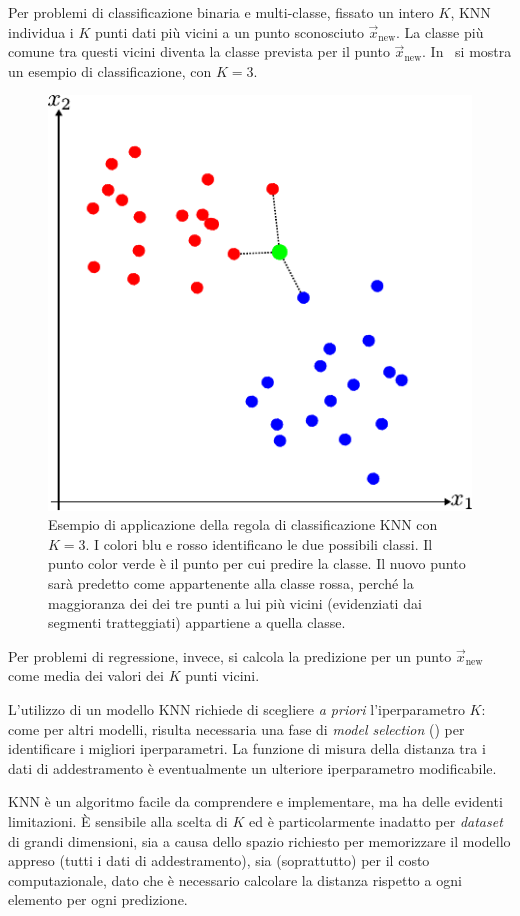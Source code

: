 Per problemi di classificazione binaria e multi-classe, fissato un intero $K$, KNN individua i $K$ punti dati più vicini a un punto sconosciuto $\Vec{x}_\text{new}$. 
La classe più comune tra questi vicini diventa la classe prevista per il punto $\Vec{x}_\text{new}$. 
In~ si mostra un esempio di classificazione, con $K=3$.
\begin{figure}
    \centering
    \includegraphics[width=0.7\linewidth]{img/KNN.pdf}
    \caption[Esempio \emph{K-Nearest Neighbors}.]{Esempio di applicazione della regola di classificazione KNN con $K=3$. I colori blu e rosso identificano le due possibili classi. Il punto color verde è il punto per cui predire la classe.
    Il nuovo punto sarà predetto come appartenente alla classe rossa, perché la maggioranza dei dei tre punti a lui più vicini (evidenziati dai segmenti tratteggiati) appartiene a quella classe.}
    \label{fig:knn_example}
\end{figure}

Per problemi di regressione, invece, si calcola la predizione per un punto $\Vec{x}_\text{new}$ come media dei valori dei $K$ punti vicini.

L'utilizzo di un modello KNN richiede di scegliere \emph{a priori} l'iperparametro $K$:
come per altri modelli, risulta necessaria una fase di \emph{model selection} () per identificare i migliori iperparametri.
La funzione di misura della distanza tra i dati di addestramento è eventualmente un ulteriore iperparametro modificabile.

KNN è un algoritmo facile da comprendere e implementare, ma ha delle evidenti limitazioni. 
\`E sensibile alla scelta di $K$ ed è particolarmente inadatto per \emph{dataset} di grandi dimensioni, sia a causa dello spazio richiesto per memorizzare il modello appreso (tutti i dati di addestramento), sia (soprattutto) per il costo computazionale, dato che è necessario calcolare la distanza rispetto a ogni elemento per ogni predizione.

